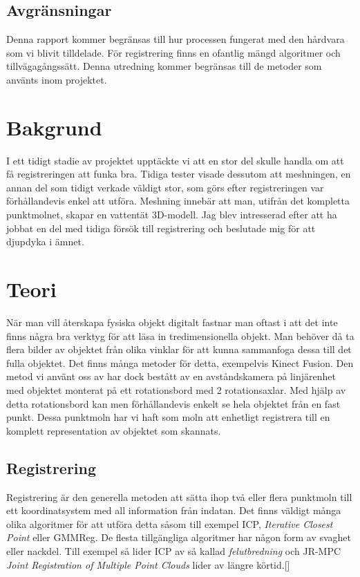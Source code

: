 \subsection{Avgränsningar}
\label{sec:limits-karlsson}
Denna rapport kommer begränsas till hur processen fungerat med den hårdvara som vi blivit tilldelade. För registrering finns en ofantlig mängd algoritmer och tillvägagångssätt. Denna utredning kommer begränsas till de metoder som använts inom projektet. 


\section{Bakgrund}
\label{sec:background-karlsson}
I ett tidigt stadie av projektet upptäckte vi att en stor del skulle handla om att få registreringen att funka bra. Tidiga tester visade dessutom att meshningen, en annan del som tidigt verkade väldigt stor, som görs efter registreringen var förhållandevis enkel att utföra. Meshning innebär att man, utifrån det kompletta punktmolnet, skapar en vattentät 3D-modell. Jag blev intresserad efter att ha jobbat en del med tidiga försök till registrering och beslutade mig för att djupdyka i ämnet.


\section{Teori}
\label{sec:theory-karlsson}

När man vill återskapa fysiska objekt digitalt fastnar man oftast i att det inte finns några bra verktyg för att läsa in tredimensionella objekt. Man behöver då ta flera bilder av objektet från olika vinklar för att kunna sammanfoga dessa till det fulla objektet. Det finns många metoder för detta, exempelvis Kinect Fusion. Den metod vi använt oss av har dock bestått av en avståndskamera på linjärenhet med objektet monterat på ett rotationsbord med 2 rotationsaxlar. Med hjälp av detta rotationsbord kan men förhållandevis enkelt se hela objektet från en fast punkt. Dessa punktmoln har vi haft som moln att enhetligt registrera till en komplett representation av objektet som skannats.


\subsection{Registrering}

Registrering är den generella metoden att sätta ihop två eller flera punktmoln till ett koordinatsystem med all information från indatan. Det finns väldigt många olika algoritmer för att utföra detta såsom till exempel ICP, \textit{Iterative Closest Point} eller GMMReg. De flesta tillgängliga algoritmer har någon form av svaghet eller nackdel. Till exempel så lider ICP av så kallad \textit{felutbredning} och JR-MPC \textit{Joint Registration of Multiple Point Clouds} lider av längre körtid.[]

